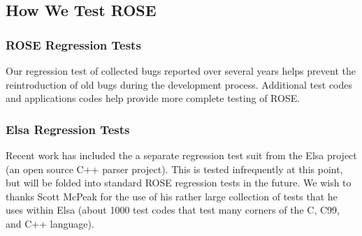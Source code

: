 \subsection{How We Test ROSE}

\subsubsection{ROSE Regression Tests}
   Our regression test of collected bugs reported over several years
helps prevent the reintroduction of old bugs during the development process.
Additional test codes and applications codes help provide more complete
testing of ROSE. 

\subsubsection{Elsa Regression Tests}
   Recent work has included the a separate regression test suit from the Elsa
project (an open source C++ parser project).  This is tested infrequently at
this point, but will be folded into standard ROSE regression tests in the future.
We wish to thanks Scott McPeak for the use of his rather large collection of
tests that he uses within Elsa (about 1000 test codes that test many corners of
the C, C99, and C++ language).


